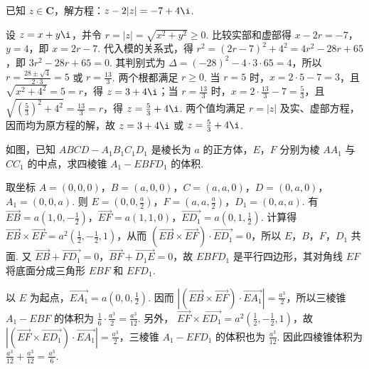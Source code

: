 \begin{problem}
已知 \(z \in \mathbf{C}\)，解方程：\(z - 2|z| = -7 + 4\i\).

\begin{solution}
设 \(z=x+y\i\)，并令 \(r=|z|=\sqrt{x^2+y^2}\geqslant0\). 比较实部和虚部得 \(x-2r=-7\)，\(y=4\)，即 \(x=2r-7\). 代入模的关系式，得
\(r^2=(2r-7)^2+4^2=4r^2-28r+65\)，即 \(3r^2-28r+65=0\). 其判别式为 \(\Delta=(-28)^2-4\cdot3\cdot65=4\)，所以
\(r=\frac{28\pm\sqrt{4}}{2\cdot3}=5\) 或 \(r=\frac{13}{3}\). 两个根都满足 \(r\geqslant0\). 当 \(r=5\) 时，\(x=2\cdot5-7=3\)，且 \(\sqrt{x^2+4^2}=5=r\)，得 \(z=3+4\i\)；当 \(r=\frac{13}{3}\) 时，\(x=2\cdot\frac{13}{3}-7=\frac{5}{3}\)，且 \(\sqrt{\left(\frac{5}{3}\right)^2+4^2}=\frac{13}{3}=r\)，得 \(z=\frac{5}{3}+4\i\). 两个值均满足 \(r=|z|\) 及实、虚部方程，因而均为原方程的解，故 \(z=3+4\i\) 或 \(z=\frac{5}{3}+4\i\).
\end{solution}
\end{problem}

\begin{problem}
如图，已知 \(ABCD-A_{1}B_{1}C_{1}D_{1}\) 是棱长为 \(a\) 的正方体，\(E\)，\(F\) 分别为棱 \(AA_{1}\) 与 \(CC_{1}\) 的中点，求四棱锥 \(A_{1}-EBFD_{1}\) 的体积.


\begin{solution}
取坐标 \(A=(0,0,0)\)，\(B=(a,0,0)\)，\(C=(a,a,0)\)，\(D=(0,a,0)\)，\(A_1=(0,0,a)\). 则 \(E=\left(0,0,\frac{a}{2}\right)\)，\(F=\left(a,a,\frac{a}{2}\right)\)，\(D_1=(0,a,a)\). 有
\(\overrightarrow{EB}=a\left(1,0,-\frac12\right)\)，\(\overrightarrow{EF}=a(1,1,0)\)，\(\overrightarrow{ED_1}=a\left(0,1,\frac12\right)\). 计算得
\(\overrightarrow{EB}\times\overrightarrow{EF}=a^2\left(\frac12,-\frac12,1\right)\)，从而 \(\left(\overrightarrow{EB}\times\overrightarrow{EF}\right)\cdot\overrightarrow{ED_1}=0\)，所以 \(E\)，\(B\)，\(F\)，\(D_1\) 共面. 又 \(\overrightarrow{EB}+\overrightarrow{FD_1}=0\)，\(\overrightarrow{BF}+\overrightarrow{D_1E}=0\)，故 \(EBFD_1\) 是平行四边形，其对角线 \(EF\) 将底面分成三角形 \(EBF\) 和 \(EFD_1\).

以 \(E\) 为起点，\(\overrightarrow{EA_1}=a\left(0,0,\frac12\right)\). 因而
\(\left|\left(\overrightarrow{EB}\times\overrightarrow{EF}\right)\cdot\overrightarrow{EA_1}\right|=\frac{a^3}{2}\)，所以三棱锥 \(A_1-EBF\) 的体积为 \(\frac{1}{6}\cdot\frac{a^3}{2}=\frac{a^3}{12}\). 另外，
\(\overrightarrow{EF}\times\overrightarrow{ED_1}=a^2\left(\frac12,-\frac12,1\right)\)，故
\(\left|\left(\overrightarrow{EF}\times\overrightarrow{ED_1}\right)\cdot\overrightarrow{EA_1}\right|=\frac{a^3}{2}\)，三棱锥 \(A_1-EFD_1\) 的体积也为 \(\frac{a^3}{12}\). 因此四棱锥体积为 \(\frac{a^3}{12}+\frac{a^3}{12}=\frac{a^3}{6}\).
\end{solution}
\end{problem}

